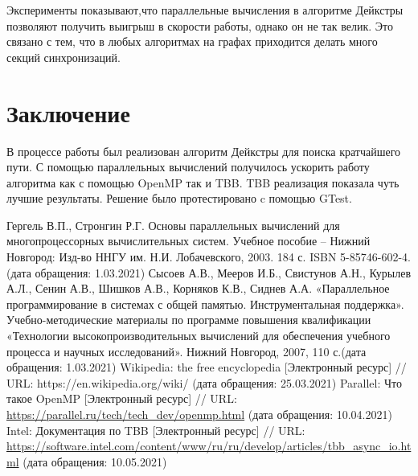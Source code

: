 \documentclass{report}
\begin{document}
\par Эксперименты показывают,что параллельные вычисления в алгоритме Дейкстры позволяют получить выигрыш в скорости работы, однако он не так велик. Это связано с тем, что в любых алгоритмах на графах приходится делать много секций синхронизаций.
\newpage



\section*{Заключение}
В процессе работы был реализован алгоритм Дейкстры для поиска кратчайшего пути. С помощью параллельных вычислений получилось ускорить работу алгоритма как с помощью OpenMP так и TBB. TBB реализация показала чуть лучшие результаты. Решение было протестировано c помощью GTest.
\newpage


\begin{thebibliography}{1}
\item Гергель В.П., Стронгин Р.Г. Основы параллельных вычислений для многопроцессорных вычислительных систем. Учебное пособие – Нижний Новгород: Изд-во ННГУ им. Н.И. Лобачевского, 2003. 184 с. ISBN 5-85746-602-4.(дата обращения: 1.03.2021)
 Сысоев А.В., Мееров И.Б., Свистунов А.Н., Курылев А.Л., Сенин А.В., Шишков А.В., Корняков К.В., Сиднев А.А. «Параллельное программирование в системах с общей памятью. Инструментальная поддержка». Учебно-методические материалы по программе повышения квалификации «Технологии высокопроизводительных вычислений для обеспечения учебного процесса и научных исследований». Нижний Новгород, 2007, 110 с.(дата обращения: 1.03.2021)
 Wikipedia: the free encyclopedia [Электронный ресурс] // URL: https://en.wikipedia.org/wiki/ (дата обращения: 25.03.2021)
 Parallel: Что такое OpenMP [Электронный ресурс] // URL: \url { https://parallel.ru/tech/tech_dev/openmp.html} (дата обращения: 10.04.2021)
 Intel: Документация по TBB [Электронный ресурс] // URL: \url {https://software.intel.com/content/www/ru/ru/develop/articles/tbb_async_io.html} (дата обращения: 10.05.2021)
\end{thebibliography}
\newpage
\end{document}
